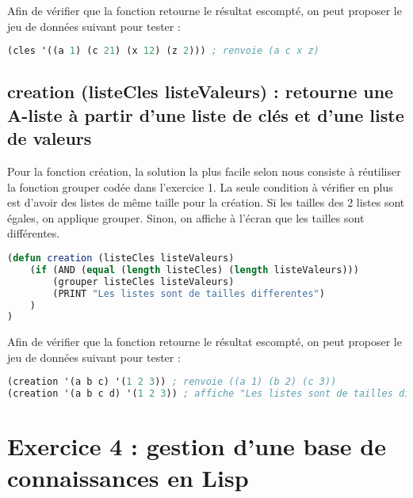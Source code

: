 \documentclass[a4paper, 12pt]{article}
\begin{document}
Afin de vérifier que la fonction retourne le résultat escompté, on peut proposer le jeu de données suivant pour tester :
\vspace{2mm}

\begin{lstlisting}[language=Lisp]
(cles '((a 1) (c 21) (x 12) (z 2))) ; renvoie (a c x z)
\end{lstlisting}
\vspace{5mm}

\subsection{creation (listeCles listeValeurs) : retourne une A-liste à partir d'une liste de clés et d'une liste de valeurs}
\vspace{3mm}

Pour la fonction création, la solution la plus facile selon nous consiste à réutiliser la fonction grouper codée dans l’exercice 1. La seule condition à vérifier en plus est d’avoir des listes de même taille pour la création. Si les tailles des 2 listes sont égales, on applique grouper. Sinon, on affiche à l’écran que les tailles sont différentes.

\vspace{2mm}

\begin{lstlisting}[language=Lisp]
(defun creation (listeCles listeValeurs)
    (if (AND (equal (length listeCles) (length listeValeurs)))
        (grouper listeCles listeValeurs)
        (PRINT "Les listes sont de tailles differentes")
    )
)
\end{lstlisting}
\vspace{2mm}

Afin de vérifier que la fonction retourne le résultat escompté, on peut proposer le jeu de données suivant pour tester :
\vspace{2mm}

\begin{lstlisting}[language=Lisp]
(creation '(a b c) '(1 2 3)) ; renvoie ((a 1) (b 2) (c 3))
(creation '(a b c d) '(1 2 3)) ; affiche "Les listes sont de tailles differentes"
\end{lstlisting}

\newpage

\section{Exercice 4 : gestion d’une base de connaissances en Lisp}
\end{document}

